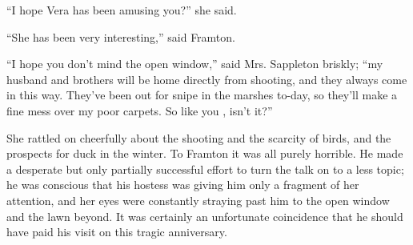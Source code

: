 \documentclass{fiche}
\begin{document}
\begin{texte}
``I hope Vera has been amusing you?'' she said.

``She has been very interesting,'' said Framton.

``I hope you don't mind the open window,'' said Mrs. Sappleton briskly; ``my husband and
brothers will be home directly from shooting, and they always come in this way. They've been
out for snipe in the marshes to-day, so they'll make a fine mess over my poor carpets. So
like you , isn't it?''

She rattled on cheerfully about the shooting and the scarcity of birds, and the prospects for
duck in the winter. To Framton it was all purely horrible. He made a desperate but only
partially successful effort to turn the talk on to a less  topic; he was conscious that his hostess was giving him only a fragment of her
attention, and her eyes were constantly straying past him to the open window and the lawn
beyond. It was certainly an unfortunate coincidence that he should have paid his visit on
this tragic anniversary.
\end{texte}

\end{document}
